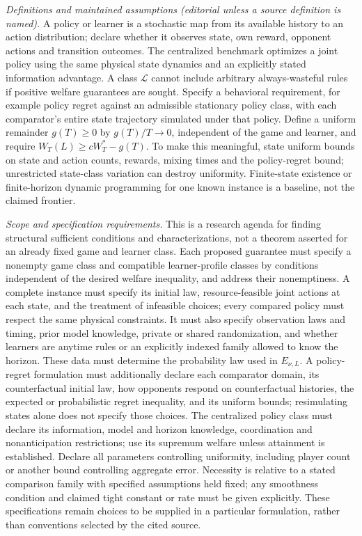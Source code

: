 \documentclass[11pt,a4paper]{article}
\begin{document}
\emph{Definitions and maintained assumptions (editorial unless a source definition is named).} A policy or learner is a stochastic map from its available history to an action distribution; declare whether it observes state, own reward, opponent actions and transition outcomes. The centralized benchmark optimizes a joint policy using the same physical state dynamics and an explicitly stated information advantage. A class \(\mathcal L\) cannot include arbitrary always-wasteful rules if positive welfare guarantees are sought. Specify a behavioral requirement, for example policy regret against an admissible stationary policy class, with each comparator’s entire state trajectory simulated under that policy. Define a uniform remainder \(g(T)\ge0\) by \(g(T)/T\to0\), independent of the game and learner, and require \(W_T(L)\ge cW_T^*-g(T)\). To make this meaningful, state uniform bounds on state and action counts, rewards, mixing times and the policy-regret bound; unrestricted state-class variation can destroy uniformity. Finite-state existence or finite-horizon dynamic programming for one known instance is a baseline, not the claimed frontier.

\emph{Scope and specification requirements.} This is a research agenda for finding structural sufficient conditions and characterizations, not a theorem asserted for an already fixed game and learner class. Each proposed guarantee must specify a nonempty game class and compatible learner-profile classes by conditions independent of the desired welfare inequality, and address their nonemptiness. A complete instance must specify its initial law, resource-feasible joint actions at each state, and the treatment of infeasible choices; every compared policy must respect the same physical constraints. It must also specify observation laws and timing, prior model knowledge, private or shared randomization, and whether learners are anytime rules or an explicitly indexed family allowed to know the horizon. These data must determine the probability law used in \(E_{\nu,L}\). A policy-regret formulation must additionally declare each comparator domain, its counterfactual initial law, how opponents respond on counterfactual histories, the expected or probabilistic regret inequality, and its uniform bounds; resimulating states alone does not specify those choices. The centralized policy class must declare its information, model and horizon knowledge, coordination and nonanticipation restrictions; use its supremum welfare unless attainment is established. Declare all parameters controlling uniformity, including player count or another bound controlling aggregate error. Necessity is relative to a stated comparison family with specified assumptions held fixed; any smoothness condition and claimed tight constant or rate must be given explicitly. These specifications remain choices to be supplied in a particular formulation, rather than conventions selected by the cited source.
\end{document}
